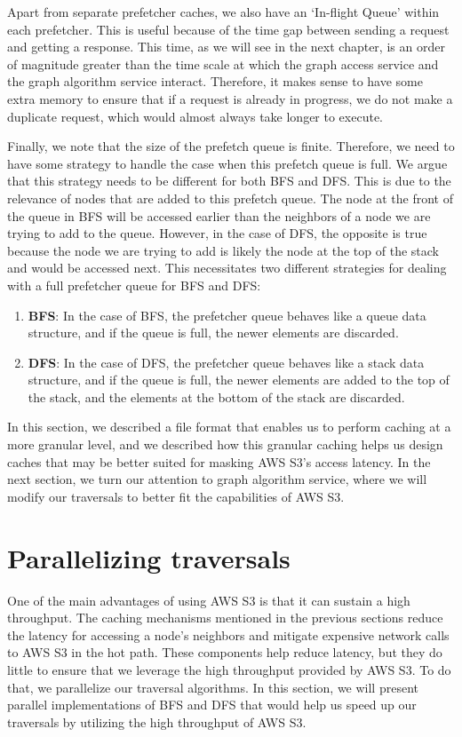 \medskip
Apart from separate prefetcher caches, we also have an `In-flight Queue' within
each prefetcher. This is useful because of the time gap between sending a
request and getting a response. This time, as we will see in the next chapter,
is an order of magnitude greater than the time scale at which the graph access
service and the graph algorithm service interact. Therefore, it makes sense to have
some extra memory to ensure that if a request is already in
progress, we do not make a duplicate request, which would almost always take
longer to execute. 

\medskip
Finally, we note that the size of the prefetch queue is finite. Therefore, we
need to have some strategy to handle the case when this prefetch queue is full.
We argue that this strategy needs to be different for both BFS and DFS. This is
due to the relevance of nodes that are added to this prefetch queue. The node at
the front of the queue in BFS will be accessed earlier than the neighbors of a
node we are trying to add to the queue. However, in the case of DFS, the
opposite is true because the node we are trying to add is likely the node
at the top of the stack and would be accessed next. This necessitates two
different strategies for dealing with a full prefetcher queue for BFS and DFS:
\begin{enumerate}
    \item \textbf{BFS}: In the case of BFS, the prefetcher queue behaves like a
        queue data structure, and if the queue is full, the newer elements are
        discarded.
    \item \textbf{DFS}: In the case of DFS, the prefetcher queue behaves like a
        stack data structure, and if the queue is full, the newer elements
        are added to the top of the stack, and the elements at the bottom of the
        stack are discarded.
\end{enumerate}

\bigskip
In this section, we described a file format that enables us to perform caching
at a more granular level, and we described how this granular caching helps us
design caches that may be better suited for masking AWS S3's access latency.
In the next section, we turn our
attention to graph algorithm service, where we will modify our traversals to
better fit the capabilities of AWS S3.


\section{Parallelizing traversals}\label{sec:parallelAlgorithms}
One of the main advantages of using AWS S3 is that it can sustain a
high throughput. The caching mechanisms mentioned in the previous sections
reduce the latency for accessing a node's neighbors and mitigate expensive
network calls to AWS S3 in the hot path. These components help reduce
latency, but they do little to ensure that we leverage the
high throughput provided by AWS S3. To do that, we parallelize our
traversal algorithms. In this section, we will present parallel implementations
of BFS and DFS that would help us speed up our traversals by utilizing the
high throughput of AWS S3.

